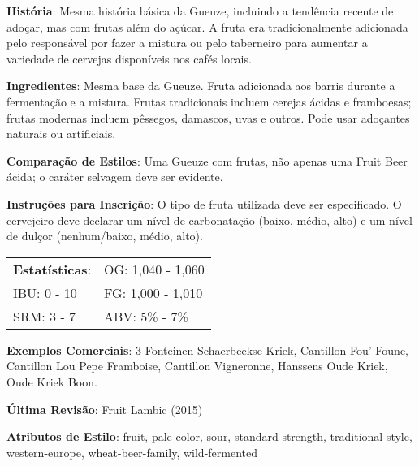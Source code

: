 \textbf{História}: Mesma história básica da Gueuze, incluindo a tendência recente de adoçar, mas com frutas além do açúcar. A fruta era tradicionalmente adicionada pelo responsável por fazer a mistura ou pelo taberneiro para aumentar a variedade de cervejas disponíveis nos cafés locais.

\textbf{Ingredientes}: Mesma base da Gueuze. Fruta adicionada aos barris durante a fermentação e a mistura. Frutas tradicionais incluem cerejas ácidas e framboesas; frutas modernas incluem pêssegos, damascos, uvas e outros. Pode usar adoçantes naturais ou artificiais.

\textbf{Comparação de Estilos}: Uma Gueuze com frutas, não apenas uma Fruit Beer ácida; o caráter selvagem deve ser evidente.

\textbf{Instruções para Inscrição}: O tipo de fruta utilizada deve ser especificado. O cervejeiro deve declarar um nível de carbonatação (baixo, médio, alto) e um nível de dulçor (nenhum/baixo, médio, alto).

\begin{tabular}{@{}p{35mm}p{35mm}@{}}
  \textbf{Estatísticas}: & OG: 1,040 - 1,060 \\
  IBU: 0 - 10  & FG: 1,000 - 1,010  \\
  SRM: 3 - 7  & ABV: 5\% - 7\%
\end{tabular}

\textbf{Exemplos Comerciais}: 3 Fonteinen Schaerbeekse Kriek, Cantillon Fou’ Foune, Cantillon Lou Pepe Framboise, Cantillon Vigneronne, Hanssens Oude Kriek, Oude Kriek Boon.

\textbf{Última Revisão}: Fruit Lambic (2015)

\textbf{Atributos de Estilo}: fruit, pale-color, sour, standard-strength, traditional-style, western-europe, wheat-beer-family, wild-fermented
